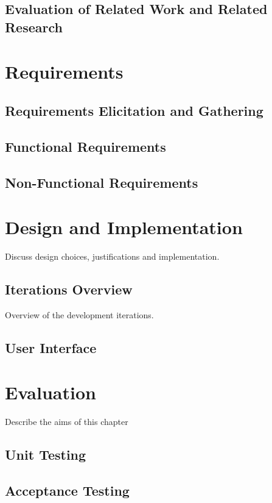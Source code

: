 \documentclass{4thYearProject}
\begin{document}
\section{Evaluation of Related Work and Related Research}

\chapter{Requirements}

\section{Requirements Elicitation and Gathering}


\section{Functional Requirements}

\newpage
\section{Non-Functional Requirements}

\chapter{Design and Implementation}

Discuss design choices, justifications and implementation.

\section{Iterations Overview}

Overview of the development iterations.

\section{User Interface}

\chapter{Evaluation}

Describe the aims of this chapter

\section{Unit Testing}
\section{Acceptance Testing}
\end{document}
